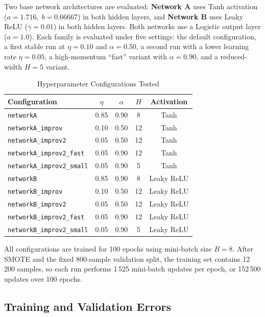 \documentclass{acm_proc_article-sp}
\begin{document}
Two base network architectures are evaluated: \textbf{Network A} uses
Tanh activation ($a = 1.716,\; b = 0.66667$) in both hidden layers, and
\textbf{Network B} uses Leaky ReLU ($\gamma = 0.01$) in both hidden
layers.  Both networks use a Logistic output layer ($a = 1.0$).  Each
family is evaluated under five settings: the default configuration, a
first stable run at $\eta=0.10$ and $\alpha=0.50$, a second run with a
lower learning rate $\eta=0.05$, a high-momentum ``fast'' variant with $\alpha=0.90$, and a
reduced-width $H=5$ variant.

\begin{table}[ht]
\centering
\small
\caption{Hyperparameter Configurations Tested}
\label{tab:configs}
\renewcommand{\arraystretch}{1.1}
\begin{tabular}{lcccc}
\toprule
Configuration & $\eta$ & $\alpha$ & $H$ & Activation \\
\midrule
\texttt{networkA}                 & 0.85 & 0.90 & 8  & Tanh \\
\texttt{networkA\_improv}         & 0.10 & 0.50 & 12 & Tanh \\
\texttt{networkA\_improv2}        & 0.05 & 0.50 & 12 & Tanh \\
\texttt{networkA\_improv2\_fast}  & 0.05 & 0.90 & 12 & Tanh \\
\texttt{networkA\_improv2\_small} & 0.05 & 0.90 & 5  & Tanh \\
\texttt{networkB}                 & 0.85 & 0.90 & 8  & Leaky ReLU \\
\texttt{networkB\_improv}         & 0.10 & 0.50 & 12 & Leaky ReLU \\
\texttt{networkB\_improv2}        & 0.05 & 0.50 & 12 & Leaky ReLU \\
\texttt{networkB\_improv2\_fast}  & 0.05 & 0.90 & 12 & Leaky ReLU \\
\texttt{networkB\_improv2\_small} & 0.05 & 0.90 & 5  & Leaky ReLU \\
\bottomrule
\end{tabular}
\end{table}

All configurations are trained for 100 epochs using mini-batch size
$B = 8$.  After SMOTE and the fixed 800-sample validation split, the
training set contains 12\,200 samples, so each run performs 1\,525
mini-batch updates per epoch, or 152\,500 updates over 100 epochs.

\subsection{Training and Validation Errors}
\end{document}
